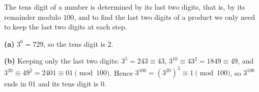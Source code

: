 The tens digit of a number is determined by its last two digits, that is, by its remainder modulo $100$, and to find the last two digits of a product we only need to keep the last two digits at each step.

\textbf{(a)} $3^6=729$, so the tens digit is $\boxed{2}$.

\textbf{(b)} Keeping only the last two digits: $3^5=243\equiv43$, $3^{10}\equiv43^2=1849\equiv49$, and $3^{20}\equiv49^2=2401\equiv01\pmod{100}$. Hence $3^{100}=\left(3^{20}\right)^5\equiv1\pmod{100}$, so $3^{100}$ ends in $01$ and its tens digit is $\boxed{0}$.
